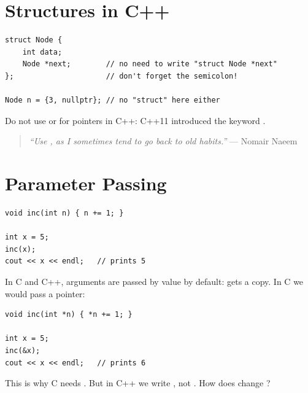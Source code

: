 \section{Structures in C++}
\begin{lstlisting}[style=cpp]
struct Node {
    int data;
    Node *next;        // no need to write "struct Node *next"
};                     // don't forget the semicolon!

Node n = {3, nullptr}; // no "struct" here either
\end{lstlisting}
Do not use  or  for pointers in C++: C++11 introduced the
keyword .
\begin{quote}
\textit{``Use , as I sometimes tend to go back to old habits.''}
--- Nomair Naeem
\end{quote}

\section{Parameter Passing}
\begin{lstlisting}[style=cpp]
void inc(int n) { n += 1; }

int x = 5;
inc(x);
cout << x << endl;   // prints 5
\end{lstlisting}
In C and C++, arguments are passed by value by default:  gets a copy.
In C we would pass a pointer:
\begin{lstlisting}[style=cpp]
void inc(int *n) { *n += 1; }

int x = 5;
inc(&x);
cout << x << endl;   // prints 6
\end{lstlisting}
\begin{center}
\end{center}
This is why C needs . But in C++ we write
, not . How does  change ?

